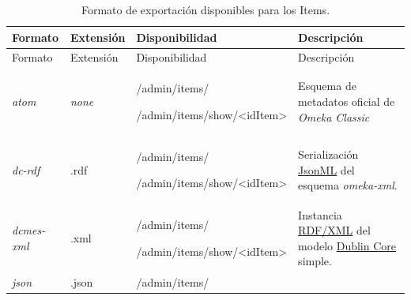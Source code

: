 \documentclass[
]{article}
\begin{document}
\begin{longtable}[]{@{}llll@{}}
\caption{Formato de exportación disponibles para los
Items.}\tabularnewline
\toprule
Formato & Extensión & Disponibilidad & Descripción\tabularnewline
\midrule
\endfirsthead
\toprule
Formato & Extensión & Disponibilidad & Descripción\tabularnewline
\midrule
\endhead
\begin{minipage}[t]{0.22\columnwidth}\raggedright
\emph{atom}\strut
\end{minipage} & \begin{minipage}[t]{0.22\columnwidth}\raggedright
\emph{none}\strut
\end{minipage} & \begin{minipage}[t]{0.22\columnwidth}\raggedright
{/admin/items/}

{/admin/items/show/\textless idItem\textgreater{}}\strut
\end{minipage} & \begin{minipage}[t]{0.22\columnwidth}\raggedright
Esquema de metadatos oficial de \emph{Omeka Classic}\strut
\end{minipage}\tabularnewline
\begin{minipage}[t]{0.22\columnwidth}\raggedright
\emph{dc-rdf}\strut
\end{minipage} & \begin{minipage}[t]{0.22\columnwidth}\raggedright
.rdf\strut
\end{minipage} & \begin{minipage}[t]{0.22\columnwidth}\raggedright
{/admin/items/}

{/admin/items/show/\textless idItem\textgreater{}}\strut
\end{minipage} & \begin{minipage}[t]{0.22\columnwidth}\raggedright
Serialización \href{http://www.jsonml.org/}{JsonML} del esquema
\emph{omeka-xml}.\strut
\end{minipage}\tabularnewline
\begin{minipage}[t]{0.22\columnwidth}\raggedright
\emph{dcmes-xml}\strut
\end{minipage} & \begin{minipage}[t]{0.22\columnwidth}\raggedright
.xml\strut
\end{minipage} & \begin{minipage}[t]{0.22\columnwidth}\raggedright
{/admin/items/}

{/admin/items/show/\textless idItem\textgreater{}}\strut
\end{minipage} & \begin{minipage}[t]{0.22\columnwidth}\raggedright
Instancia \href{https://www.w3.org/TR/rdf-syntax-grammar/}{RDF/XML} del
modelo \href{http://dublincore.org/documents/dcmes-xml/}{Dublin Core}
simple.\strut
\end{minipage}\tabularnewline
\begin{minipage}[t]{0.22\columnwidth}\raggedright
\emph{json}\strut
\end{minipage} & \begin{minipage}[t]{0.22\columnwidth}\raggedright
.json\strut
\end{minipage} & \begin{minipage}[t]{0.22\columnwidth}\raggedright
{/admin/items/}


\end{minipage}
\end{longtable}
\end{document}
